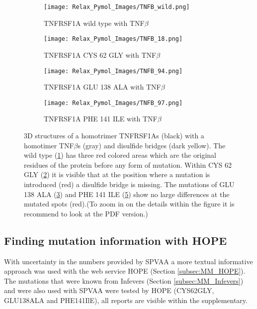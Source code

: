 		\begin{figure}[!ht]
		\centering
		\begin{subfigure}{0.49\textwidth}
			\texttt{[image: Relax\_Pymol\_Images/TNFB\_wild.png]}
			\caption{TNFRSF1A wild type with TNF$\beta$}
			\label{fig:RES_TNFB_wild}
		\end{subfigure}
		\begin{subfigure}{0.49\textwidth}
			\texttt{[image: Relax\_Pymol\_Images/TNFB\_18.png]}
			\caption{TNFRSF1A CYS 62 GLY with TNF$\beta$}
			\label{fig:RES_TNFB_18}
		\end{subfigure}
		\par\bigskip
		\begin{subfigure}{0.49\textwidth}
			\texttt{[image: Relax\_Pymol\_Images/TNFB\_94.png]}
			\caption{TNFRSF1A GLU 138 ALA with TNF$\beta$}
			\label{fig:RES_TNFB_94}
		\end{subfigure}
		\begin{subfigure}{0.49\textwidth}
			\texttt{[image: Relax\_Pymol\_Images/TNFB\_97.png]}
			\caption{TNFRSF1A PHE 141 ILE with TNF$\beta$}
			\label{fig:RES_TNFB_97}
		\end{subfigure}
	\caption[TNFRSF1A homotrimer with TNF$\beta$ homo trimers wild type and mutated relaxed models]{3D structures of a homotrimer TNFRSF1As (black) with a homotimer TNF$\beta$s (gray) and disulfide bridges (dark yellow). The wild type (\ref{fig:RES_TNFB_wild}) has three red colored areas which are the original residues of the protein before any form of mutation. Within CYS 62 GLY (\ref{fig:RES_TNFB_18}) it is visible that at the position where a mutation is introduced (red) a disulfide bridge is missing. The mutations of GLU 138 ALA (\ref{fig:RES_TNFB_94}) and PHE 141 ILE (\ref{fig:RES_TNFB_97}) show no large differences at the mutated spots (red).(To zoom in on the details within the figure it is recommend to look at the PDF version.)}
	\end{figure}
	
\newpage
	
\newpage	
\subsection{Finding mutation information with HOPE}
	With uncertainty in the numbers provided by SPVAA a more textual informative approach was used with the web service HOPE (Section \ref{subsec:MM_HOPE}). The mutations that were known from Infevers (Section \ref{subsec:MM_Infevers}) and were also used with SPVAA were tested by HOPE (CYS62GLY, GLU138ALA and PHE141IlE), all reports are visible within the supplementary.
	
